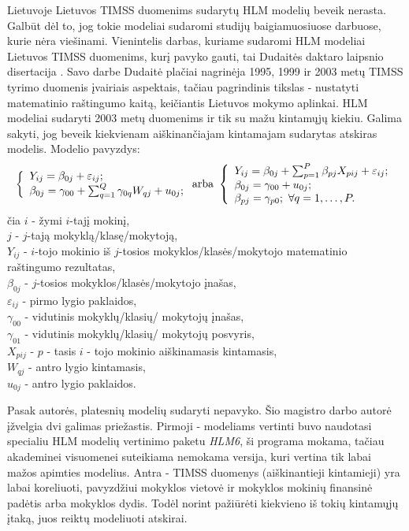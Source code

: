 \documentclass[11pt,a4paper]{article}
\begin{document}
\indent Lietuvoje Lietuvos TIMSS duomenims sudarytų HLM modelių beveik nerasta. Galbūt dėl to, jog tokie modeliai sudaromi studijų baigiamuosiuose darbuose, kurie nėra viešinami. Vienintelis darbas, kuriame sudaromi HLM modeliai Lietuvos TIMSS duomenims, kurį pavyko gauti, tai Dudaitės daktaro laipsnio disertacija \cite{liet2003}. Savo darbe Dudaitė plačiai nagrinėja 1995, 1999 ir 2003 metų TIMSS tyrimo duomenis įvairiais aspektais, tačiau pagrindinis tikslas - nustatyti matematinio raštingumo kaitą, keičiantis Lietuvos mokymo aplinkai. HLM modeliai sudaryti 2003 metų duomenims ir tik su mažu kintamųjų kiekiu. Galima sakyti, jog beveik kiekvienam aiškinančiajam kintamajam sudarytas atskiras modelis. Modelio pavyzdys:
\[
\left\{
\begin{array}{l l}
Y_{ij} = \beta_{0j}+\varepsilon_{ij}; \\
\beta_{0j} = \gamma_{00} + \sum^Q_{q=1}\gamma_{0q}W_{qj}+u_{0j};
\end{array} \right.
\text{arba}\
\left\{
\begin{array}{l l}
Y_{ij} = \beta_{0j}+\sum^P_{p=1}\beta_{pj}X_{pij}+\varepsilon_{ij}; \\
\beta_{0j} = \gamma_{00} + u_{0j};\\
\beta_{pj} = \gamma_{p0}; \ \forall q=1,\dots,P.
\end{array} \right.
\]
čia $i$ - žymi $i$-tajį mokinį,\\
$j$ - $j$-tają mokyklą/klasę/mokytoją,\\
$Y_{ij}$ - $i$-tojo mokinio iš $j$-tosios mokyklos/klasės/mokytojo matematinio raštingumo rezultatas,\\
$\beta_{0j}$ - $j$-tosios mokyklos/klasės/mokytojo įnašas,\\
$\varepsilon_{ij}$ - pirmo lygio paklaidos,\\
$\gamma_{00}$ - vidutinis mokyklų/klasių/ mokytojų įnašas,\\
$\gamma_{01}$ - vidutinis mokyklų/klasių/ mokytojų posvyris,\\
$X_{pij}$ - $p$ - tasis $i$ - tojo mokinio aiškinamasis kintamasis,\\
$W_{qj}$ - antro lygio kintamasis, \\
$u_{0j}$ - antro lygio paklaidos.

\indent Pasak autorės, platesnių modelių sudaryti nepavyko. Šio magistro darbo autorė įžvelgia dvi galimas priežastis. Pirmoji - modeliams vertinti buvo naudotasi specialiu HLM modelių vertinimo paketu \textit{HLM6}, ši programa mokama, tačiau akademinei visuomenei suteikiama nemokama versija, kuri vertina tik labai mažos apimties modelius. Antra - TIMSS duomenys (aiškinantieji kintamieji) yra labai koreliuoti, pavyzdžiui mokyklos vietovė ir mokyklos mokinių finansinė padėtis arba mokyklos dydis. Todėl norint pažiūrėti kiekvieno iš tokių kintamųjų įtaką, juos reiktų modeliuoti atskirai.
\end{document}
